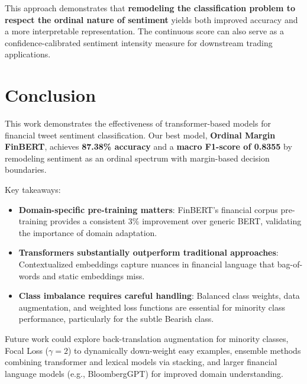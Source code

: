 \documentclass[11pt,a4paper]{article}
\begin{document}
This approach demonstrates that \textbf{remodeling the classification problem to respect the ordinal nature of sentiment} yields both improved accuracy and a more interpretable representation. The continuous score can also serve as a confidence-calibrated sentiment intensity measure for downstream trading applications.

\section{Conclusion}

This work demonstrates the effectiveness of transformer-based models for financial tweet sentiment classification. Our best model, \textbf{Ordinal Margin FinBERT}, achieves \textbf{87.38\% accuracy} and a \textbf{macro F1-score of 0.8355} by remodeling sentiment as an ordinal spectrum with margin-based decision boundaries.

Key takeaways:
\begin{itemize}[noitemsep]
    \item \textbf{Domain-specific pre-training matters}: FinBERT's financial corpus pre-training provides a consistent 3\% improvement over generic BERT, validating the importance of domain adaptation.
    \item \textbf{Transformers substantially outperform traditional approaches}: Contextualized embeddings capture nuances in financial language that bag-of-words and static embeddings miss.
    \item \textbf{Class imbalance requires careful handling}: Balanced class weights, data augmentation, and weighted loss functions are essential for minority class performance, particularly for the subtle Bearish class.
\end{itemize}

Future work could explore back-translation augmentation for minority classes, Focal Loss ($\gamma=2$) to dynamically down-weight easy examples, ensemble methods combining transformer and lexical models via stacking, and larger financial language models (e.g., BloombergGPT) for improved domain understanding.
\end{document}
